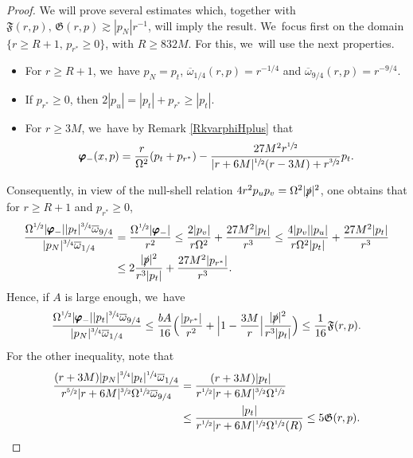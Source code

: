 \documentclass[JEP,XML,SOM,Unicode,published]{cedram}
\theoremstyle{plain}
\theoremstyle{definition}
\begin{document}
\begin{proof}
We will prove several estimates which, together with $\mathfrak{F}(r,p), \, \mathfrak{G} (r,p) \gtrsim |p_N| r^{-1}$, will imply the result. We~focus first on the domain $\{ r \geq R+1, \, p_{r^*} \geq 0 \}$, with $R \geq 832M$. For this, we~will use the next properties.
\begin{itemize}
\item For $r \geq R+1$, we~have $p_N=p_t$, $\overline{\omega}_{1/4}(r,p)=r^{-1/4}$ and $\overline{\omega}_{9/4}(r,p)=r^{-9/4}$.
\item If $p_{r^*} \geq 0$, then $2|p_u|=|p_t|+p_{r^*}\geq |p_t|$.
\item For $ r \geq 3M$, we~have by Remark \ref{RkvarphiHplus} that\vspace*{-3pt}
\begin{equation*}
\pmb{\varphi}_-(x,p)= \frac{r }{\Omega^2}(p_t+ p_{r^*}) -\frac{27M^2r^{\sfrac{1}{2}}}{|r+6M|^{\sfrac{1}{2}}(r-3M)+r^{\sfrac{3}{2}}} p_t.
\end{equation*}
\end{itemize}
Consequently, in view of the null-shell relation $4r^2p_up_v=\Omega^2 |\slashed{p}|^2$, one obtains that for $r \geq R+1$ and $p_{r^* } \geq 0$,
\begin{align*}
\frac{ \Omega^{\sfrac{1}{2}}|\pmb{\varphi}_-||p_t|^{\sfrac{3}{4}}\overline{\omega}_{9/4}}{ |p_N|^{\sfrac{3}{4}}\overline{\omega}_{1/4}} & = \frac{ \Omega^{\sfrac{1}{2}}|\pmb{\varphi}_-|}{r^2}\leq \frac{2|p_v|}{r\Omega^2}+ \frac{27M^2|p_t|}{r^3} \leq \frac{4|p_v||p_u|}{r\Omega^2|p_t|}+ \frac{27M^2|p_t|}{r^3} \\[-3pt]
&\leq 2\frac{|\slashed{p}|^2}{r^3|p_t|}+\frac{27M^2|p_{r^*}|}{r^3}.
\end{align*}
Hence, if $A$ is large enough, we~have
\[
\frac{ \Omega^{\sfrac{1}{2}}|\pmb{\varphi}_-||p_t|^{\sfrac{3}{4}}\overline{\omega}_{9/4}}{ |p_N|^{\sfrac{3}{4}}\overline{\omega}_{1/4}} \leq \frac{bA}{16} \Bigl(\frac{|p_{r^*}|}{r^2}+ \Bigl |1-\frac{3M}{r} \Bigr| \frac{|\slashed{p}|^2}{r^3 |p_t|} \Bigr) \leq \frac{1}{16} \mathfrak{F}(r,p).
\]
For the other inequality, note that\vspace*{-3pt}\enlargethispage{\baselineskip}
\begin{align*}
\frac{(r+3M)|p_N|^{\sfrac{3}{4}} |p_t|^{\sfrac{1}{4}}\overline{\omega}_{1/4} }{r^{\sfrac{5}{2}}|r+6M|^{\sfrac{3}{2}}\Omega^{\sfrac{1}{2}} \overline{\omega}_{9/4}} &= \frac{(r+3M) |p_t| }{r^{\sfrac{1}{2}}|r+6M|^{\sfrac{3}{2}}\Omega^{\sfrac{1}{2}} }\\
&\leq \frac{|p_t|}{r^{\sfrac{1}{2}}|r+6M|^{\sfrac{1}{2}} \Omega^{\sfrac{1}{2}}(R)} \leq 5 \mathfrak{G}(r,p).
\end{align*}


\end{proof}
\end{document}
